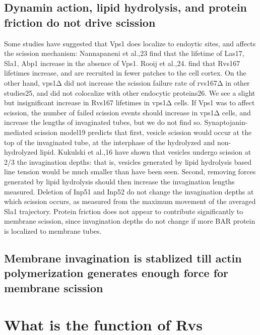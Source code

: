 \subsection{Dynamin action, lipid hydrolysis, and protein friction do not drive scission}
Some studies have suggested that Vps1 does localize to endoytic sites, and affects the scission mechanism: Nannapaneni et al.,23 find that the lifetime of Las17, Sla1, Abp1 increase in the absence of Vps1. Rooij et al.,24. find that Rvs167 lifetimes increase, and are recruited in fewer patches to the cell cortex. On the other hand, vps1Δ did not increase the scission failure rate of rvs167Δ in other studies25, and did not colocalize with other endocytic proteins26. We see a slight but insignificant increase in Rvs167 lifetimes in vps1Δ cells. If Vps1 was to affect scission, the number of failed scission events should increase in vps1Δ cells, and increase the lengths of invaginated tubes, but we do not find so. Synaptojanin-mediated scission model19 predicts that first, vesicle scission would occur at the top of the invaginated tube, at the interphase of the hydrolyzed and non-hydrolyzed lipid. Kukulski et al.,16 have shown that vesicles undergo scission at 2/3 the invagination depths: that is, vesicles generated by lipid hydrolysis based line tension would be much smaller than have been seen. Second, removing forces generated by lipid hydrolysis should then increase the invagination lengths measured. Deletion of Inp51 and Inp52 do not change the invagination depths at which scission occurs, as measured from the maximum movement of the averaged Sla1 trajectory. Protein friction does not appear to contribute significantly to membrane scission, since invagination depths do not change if more BAR protein is localized to membrane tubes.

\subsection{ Membrane invagination is stablized till actin polymerization generates enough force for membrane scission}

\section{What is the function of Rvs}

